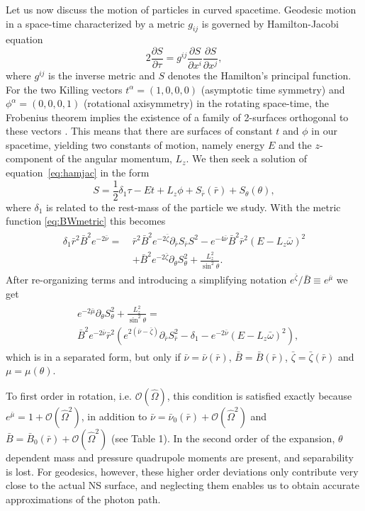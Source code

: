 \documentclass{aa}
\newcommand{\be}{\begin{equation}}
\newcommand{\ee}{\end{equation}}
\newcommand{\pd}{\ensuremath{\partial}} %
\newcommand{\rb}{\ensuremath{\bar{r}}}
\newcommand{\wb}{\ensuremath{\bar{\omega}}}
\newcommand{\Ob}{\ensuremath{\hat{\Omega}}}
\newcommand{\nub}{\ensuremath{\bar{\nu}}}
\newcommand{\zetab}{\ensuremath{\bar{\zeta}}}
\newcommand{\Bb}{\ensuremath{\bar{B}}}
\newcommand{\mub}{\ensuremath{\bar{\mu}}}
\begin{document}
Let us now discuss the motion of particles in curved spacetime.
Geodesic motion in a space-time characterized by a metric $g_{ij}$ is governed by Hamilton-Jacobi equation
\be\label{eq:hamjac}
2\frac{\pd S}{\pd \tau} = g^{ij} \frac{\pd S}{\pd x^i}\frac{\pd S}{\pd x^j},
\ee
where $g^{ij}$ is the inverse metric and $S$ denotes the Hamilton's principal function.
For the two Killing vectors $t^{\alpha} = (1,0,0,0)$ (asymptotic time symmetry) and $\phi^{\alpha} = (0,0,0,1)$ (rotational axisymmetry) in the rotating space-time, the Frobenius theorem implies the existence of a family of 2-surfaces orthogonal to these vectors \citep[see e.g.,][p.12]{rcs}.  
This means that there are surfaces of constant $t$ and $\phi$ in our spacetime, yielding two constants of motion, namely energy $E$ and the $z$-component of the angular momentum, $L_z$.  
We then seek a solution of equation~\eqref{eq:hamjac} in the form
\be
S = \frac{1}{2}\delta_1 \tau - Et + L_z\phi + S_{\rb}(\rb) + S_{\theta}(\theta),
\ee
where $\delta_1$ is related to the rest-mass of the particle we study.
With the metric function \eqref{eq:BWmetric} this becomes
\begin{align}\begin{split} 
    \delta_1 \rb^2 \Bb^2 e^{-2\nub} =~& \rb^2 \Bb^2 e^{-2\zetab} \pd_{\rb}S_{\rb}S^2 - e^{-4\nub} \Bb^2 \rb^2 (E - L_z \wb)^2 \\
                                & + \Bb^2 e^{-2\zetab} \pd_{\theta}S_{\theta}^2 + \frac{L_z^2}{\sin^2\theta}.
\end{split}\end{align}
After re-organizing terms and introducing a simplifying notation $e^{\zetab}/\Bb \equiv e^{\mub}$ we get
\begin{align}\begin{split}\label{eq:S}
& e^{-2\mub}\pd_{\theta}S_{\theta}^2 + \frac{L_z^2}{\sin^2\theta} = \\ 
& \Bb^2 e^{-2\nub}\rb^2 ( e^{2(\nub-\zetab)} \pd_{\rb}S_{\rb}^2 -\delta_{1} - e^{-2\nub}(E - L_z \wb)^2 ), 
\end{split}\end{align}
which is in a separated form, but only if $\nub = \nub(\rb)$, $\Bb = \Bb(\rb)$, $\zetab = \zetab(\rb)$ and $\mu = \mu(\theta)$.

To first order in rotation, i.e. $\mathcal{O}(\Ob)$, this condition is satisfied exactly because $e^{\mub} = 1 + \mathcal{O}(\Ob^2)$, in addition to $\nub = \nub_0(\rb) + \mathcal{O}(\Ob^2)$ and $\Bb = \Bb_0(\rb) + \mathcal{O}(\Ob^2)$ (see Table 1).  
In the second order of the expansion, $\theta$ dependent mass and pressure quadrupole moments are present, and separability is lost.
For geodesics, however, these higher order deviations only contribute very close to the actual NS surface, and neglecting them enables us to obtain accurate approximations of the photon path.
\end{document}
